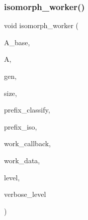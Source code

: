 \subsubsection{\texorpdfstring{isomorph\+\_\+worker()}{isomorph\_worker()}}
{\footnotesize\ttfamily void isomorph\+\_\+worker (\begin{DoxyParamCaption}\item[{\mbox{\hyperlink{classaction}{action}} $\ast$}]{A\+\_\+base,  }\item[{\mbox{\hyperlink{classaction}{action}} $\ast$}]{A,  }\item[{\mbox{\hyperlink{classgenerator}{generator}} $\ast$}]{gen,  }\item[{\mbox{\hyperlink{galois_8h_a09fddde158a3a20bd2dcadb609de11dc}{I\+NT}}}]{size,  }\item[{const \mbox{\hyperlink{galois_8h_ab6cc7b4aeb6ea31aba2b3fbfc83ff5e6}{B\+Y\+TE}} $\ast$}]{prefix\+\_\+classify,  }\item[{const \mbox{\hyperlink{galois_8h_ab6cc7b4aeb6ea31aba2b3fbfc83ff5e6}{B\+Y\+TE}} $\ast$}]{prefix\+\_\+iso,  }\item[{void($\ast$)(\mbox{\hyperlink{classisomorph}{isomorph}} $\ast$Iso, void $\ast$data, \mbox{\hyperlink{galois_8h_a09fddde158a3a20bd2dcadb609de11dc}{I\+NT}} \mbox{\hyperlink{simeon_8_c_a818073fbcc2f439e7c56952f67386122}{verbose\+\_\+level}})}]{work\+\_\+callback,  }\item[{void $\ast$}]{work\+\_\+data,  }\item[{\mbox{\hyperlink{galois_8h_a09fddde158a3a20bd2dcadb609de11dc}{I\+NT}}}]{level,  }\item[{\mbox{\hyperlink{galois_8h_a09fddde158a3a20bd2dcadb609de11dc}{I\+NT}}}]{verbose\+\_\+level }\end{DoxyParamCaption})}

